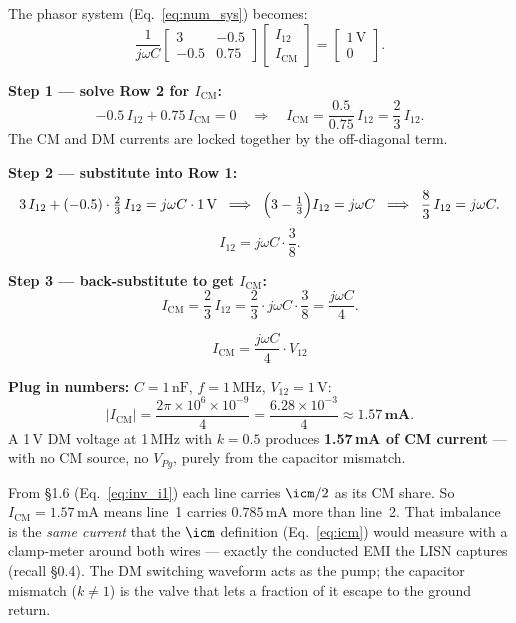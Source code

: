 The phasor system (Eq.~\ref{eq:num_sys}) becomes:
\[
\frac{1}{j\omega C}
\begin{bmatrix} 3 & -0.5 \\ -0.5 & 0.75 \end{bmatrix}
\begin{bmatrix} I_{12} \\ I_{\mathrm{CM}} \end{bmatrix}
=
\begin{bmatrix} 1\,\mathrm{V} \\ 0 \end{bmatrix}.
\]

\textbf{Step 1 — solve Row 2 for $I_{\mathrm{CM}}$:}
\[
    -0.5\,I_{12} + 0.75\,I_{\mathrm{CM}} = 0
    \quad\Longrightarrow\quad
    I_{\mathrm{CM}} = \frac{0.5}{0.75}\,I_{12} = \frac{2}{3}\,I_{12}.
\]
The CM and DM currents are locked together by the off-diagonal term.

\textbf{Step 2 — substitute into Row 1:}
\[
    3\,I_{12} + (-0.5)\cdot\tfrac{2}{3}\,I_{12}
    = j\omega C \cdot 1\,\mathrm{V}
    \;\;\Longrightarrow\;\;
    \Bigl(3 - \tfrac{1}{3}\Bigr)I_{12} = j\omega C
    \;\;\Longrightarrow\;\;
    \frac{8}{3}\,I_{12} = j\omega C.
\]
\[
    I_{12} = j\omega C \cdot \frac{3}{8}.
\]

\textbf{Step 3 — back-substitute to get $I_{\mathrm{CM}}$:}
\[
    I_{\mathrm{CM}}
    = \frac{2}{3}\,I_{12}
    = \frac{2}{3} \cdot j\omega C \cdot \frac{3}{8}
    = \frac{j\omega C}{4}.
\]

\begin{eqnbox}[CM Current Generated by a Pure DM Source ($k=0.5$, $N=2$)]
\begin{equation}
    I_{\mathrm{CM}} = \frac{j\omega C}{4}\cdot V_{12}
    \label{eq:ICM_result}
\end{equation}
\end{eqnbox}

\textbf{Plug in numbers:} $C = 1\,\text{nF}$, $f = 1\,\text{MHz}$,
$V_{12} = 1\,\text{V}$:
\[
|I_{\mathrm{CM}}|
= \frac{2\pi \times 10^6 \times 10^{-9}}{4}
= \frac{6.28 \times 10^{-3}}{4}
\approx \mathbf{1.57\,\text{mA}}.
\]
A 1\,V DM voltage at 1\,MHz with $k = 0.5$ produces
\textbf{1.57\,mA of CM current} — with no CM source, no $V_{Pg}$,
purely from the capacitor mismatch.

\begin{warningbox}
From \S1.6 (Eq.~\ref{eq:inv_i1}) each line carries $\icm/2$ as its
CM share.  So $I_{\mathrm{CM}} = 1.57\,\text{mA}$ means line~1
carries $0.785\,\text{mA}$ more than line~2.  That imbalance is the
\emph{same current} that the $\icm$ definition (Eq.~\ref{eq:icm})
would measure with a clamp-meter around both wires — exactly the
conducted EMI the LISN captures (recall \S0.4).
The DM switching waveform acts as the pump; the capacitor
mismatch ($k \neq 1$) is the valve that lets a fraction of it
escape to the ground return.
\end{warningbox}

